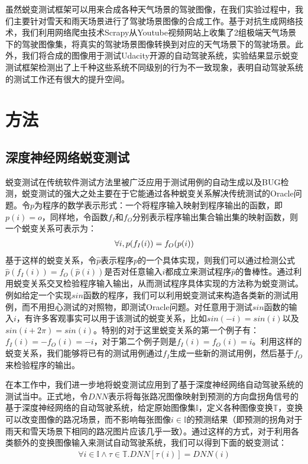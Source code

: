 虽然蜕变测试框架可以用来合成各种天气场景的驾驶图像，在我们实验过程中，我们主要针对雪天和雨天场景进行了驾驶场景图像的合成工作。基于对抗生成网络技术，我们利用网络爬虫技术Scrapy从Youtube视频网站上收集了2组极端天气场景下的驾驶图像集，将真实的驾驶场景图像转换到对应的天气场景下的驾驶场景。此外，我们将合成的图像用于测试Udacity开源的自动驾驶系统\cite{udacity_as}，实验结果显示蜕变测试框架检测出了上千种这些系统不同级别的行为不一致现象，表明自动驾驶系统的测试工作还有很大的提升空间。

\section{方法}

\subsection{深度神经网络蜕变测试}

蜕变测试在传统软件测试方法里被广泛应用于测试用例的自动生成以及BUG检测，蜕变测试的强大之处主要在于它能通过各种蜕变关系解决传统测试的Oracle问题。令$p$为程序的数学表示形式：一个将程序输入映射到程序输出的函数，即$p(i) = o$，同样地，令函数$f_I$和$f_O$分别表示程序输出集合输出集的映射函数，则一个蜕变关系可表示为：
\begin{gather}
    \centering
    \forall i, p(f_I(i))=f_O(p(i))
    \label{f:mt}
\end{gather}
基于这样的蜕变关系，令$\hat{p}$表示程序$p$的一个具体实现，则我们可以通过检测公式$\hat{p}(f_I(i))=f_O(\hat{p}(i))$是否对任意输入$i$都成立来测试程序$\hat{p}$的鲁棒性。通过利用蜕变关系交叉检验程序输入输出，从而测试程序具体实现的方法称为蜕变测试。例如给定一个实现$sin$函数的程序，我们可以利用蜕变测试来构造各类新的测试用例，而不用担心测试的对照物，即测试Oracle问题。对任意用于测试$sin$函数的输入$i$，有许多客观事实可以用于该测试的蜕变关系，比如$sin(-i)=sin(i)$以及$sin(i+2\pi)=sin(i)$。特别的对于这里蜕变关系的第一个例子有：$f_I(i)=-f_O(i)=-i$，对于第二个例子则是$f_I(i)=f_O(i)=i$。利用这样的蜕变关系，我们能够将已有的测试用例通过$f_I$生成一些新的测试用例，然后基于$f_O$来检验程序的输出。

在本工作中，我们进一步地将蜕变测试应用到了基于深度神经网络自动驾驶系统的测试当中。正式地，令$DNN$表示将每张路况图像映射到预测的方向盘拐角信号的基于深度神经网络的自动驾驶系统，给定原始图像集$\mathbb{I}$，定义各种图像变换$\mathbb{T}$，变换可以改变图像的路况场景，而不影响每张图像$i\in \mathbb{I}$的预测结果（即预测的拐角对于雨天和雪天场景下相同的路况图片应该几乎一致）。通过这样的方式，对于利用各类额外的变换图像输入来测试自动驾驶系统，我们可以得到下面的蜕变测试：
\begin{gather}
    \forall i \in \mathbb{I} \wedge \tau \in \mathbb{T}. DNN[\tau(i)]=DNN(i)
\end{gather}

